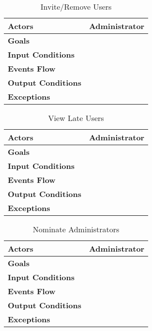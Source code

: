 \begin{table}[H]
	\centering
	\def\arraystretch{1.5}
	\begin{tabular}{|p{7cm}|p{7cm}|}
		\hline
		\textbf{Actors}            & Administrator    \\ \hline
		\textbf{Goals}             &            \\ \hline
		\textbf{Input Conditions}  &            \\ \hline
		\textbf{Events Flow}       &            \\ \hline
		\textbf{Output Conditions} &            \\ \hline
		\textbf{Exceptions}        &            \\ \hline
	\end{tabular}
	\caption{Invite/Remove Users}
\end{table}

\begin{table}[H]
	\centering
	\def\arraystretch{1.5}
	\begin{tabular}{|p{7cm}|p{7cm}|}
		\hline
		\textbf{Actors}            & Administrator    \\ \hline
		\textbf{Goals}             &            \\ \hline
		\textbf{Input Conditions}  &            \\ \hline
		\textbf{Events Flow}       &            \\ \hline
		\textbf{Output Conditions} &            \\ \hline
		\textbf{Exceptions}        &            \\ \hline
	\end{tabular}
	\caption{View Late Users}
\end{table}

\begin{table}[H]
	\centering
	\def\arraystretch{1.5}
	\begin{tabular}{|p{7cm}|p{7cm}|}
		\hline
		\textbf{Actors}            & Administrator    \\ \hline
		\textbf{Goals}             &            \\ \hline
		\textbf{Input Conditions}  &            \\ \hline
		\textbf{Events Flow}       &            \\ \hline
		\textbf{Output Conditions} &            \\ \hline
		\textbf{Exceptions}        &            \\ \hline
	\end{tabular}
	\caption{Nominate Administrators}
\end{table}

